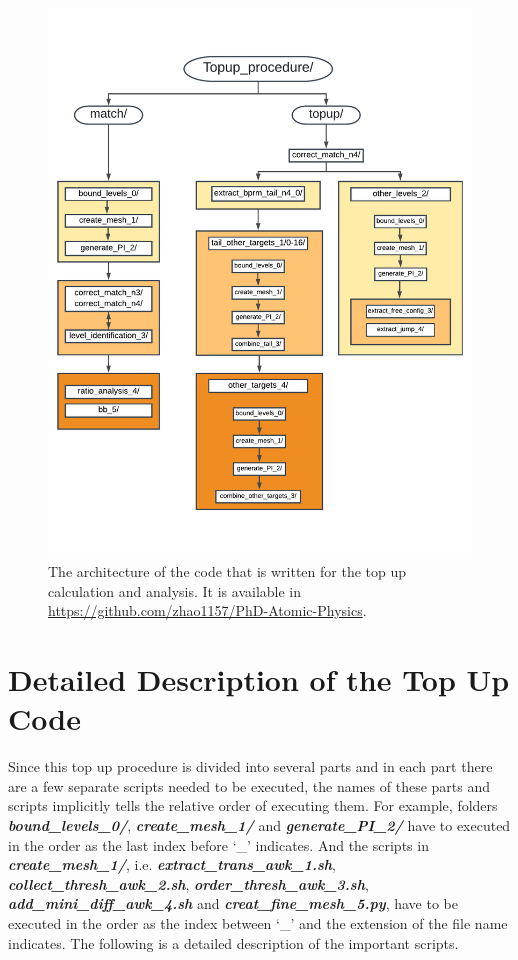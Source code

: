 \begin{figure}
	\centering
	\includegraphics[width=1.0\textwidth]{app_1/figures/topup_procedure_flowchart}
	\caption{The architecture of the code that is written for the top up calculation and analysis. It is available in \url{https://github.com/zhao1157/PhD-Atomic-Physics}.}
	\label{fig_topup_flowchart}
\end{figure}

\section{Detailed Description of the Top Up Code}
\label{section_detailed_topup_code}
Since this top up procedure is divided into several parts and in each part there are a few separate scripts needed to be executed, the names of these parts and scripts implicitly tells the relative order of executing them. For example, folders \textbf{\textit{bound\_levels\_0/}}, \textbf{\textit{create\_mesh\_1/}} and \textbf{\textit{generate\_PI\_2/}} have to executed in the order as the last index before `\_' indicates. And the scripts in \textbf{\textit{create\_mesh\_1/}}, i.e. \textbf{\textit{extract\_trans\_awk\_1.sh}}, \textbf{\textit{collect\_thresh\_awk\_2.sh}}, \textbf{\textit{order\_thresh\_awk\_3.sh}}, \textbf{\textit{add\_mini\_diff\_awk\_4.sh}} and  \textbf{\textit{creat\_fine\_mesh\_5.py}}, have to be executed in the order as the index between `\_' and the extension of the file name indicates. The following is a detailed description of the important scripts.

